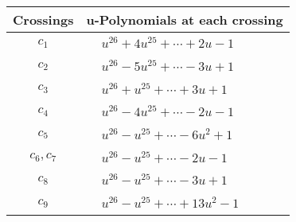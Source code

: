\documentclass[1p]{elsarticle_modified}
\theoremstyle{definition}
\begin{document}
\begin{tabular}{m{50pt}|m{274pt}}
Crossings & \hspace{64pt}u-Polynomials at each crossing \\
\hline $$\begin{aligned}c_{1}\end{aligned}$$&$\begin{aligned}
&u^{26}+4 u^{25}+\cdots+2 u-1
\end{aligned}$\\
\hline $$\begin{aligned}c_{2}\end{aligned}$$&$\begin{aligned}
&u^{26}-5 u^{25}+\cdots-3 u+1
\end{aligned}$\\
\hline $$\begin{aligned}c_{3}\end{aligned}$$&$\begin{aligned}
&u^{26}+u^{25}+\cdots+3 u+1
\end{aligned}$\\
\hline $$\begin{aligned}c_{4}\end{aligned}$$&$\begin{aligned}
&u^{26}-4 u^{25}+\cdots-2 u-1
\end{aligned}$\\
\hline $$\begin{aligned}c_{5}\end{aligned}$$&$\begin{aligned}
&u^{26}- u^{25}+\cdots-6 u^2+1
\end{aligned}$\\
\hline $$\begin{aligned}c_{6},c_{7}\end{aligned}$$&$\begin{aligned}
&u^{26}- u^{25}+\cdots-2 u-1
\end{aligned}$\\
\hline $$\begin{aligned}c_{8}\end{aligned}$$&$\begin{aligned}
&u^{26}- u^{25}+\cdots-3 u+1
\end{aligned}$\\
\hline $$\begin{aligned}c_{9}\end{aligned}$$&$\begin{aligned}
&u^{26}- u^{25}+\cdots+13 u^2-1
\end{aligned}$\\

\end{tabular}
\end{document}
